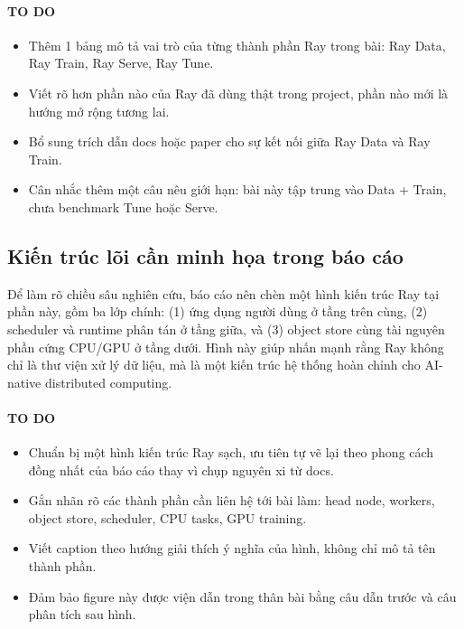 \paragraph{TO DO}
\begin{itemize}
    \item Thêm 1 bảng mô tả vai trò của từng thành phần Ray trong bài: Ray Data, Ray Train, Ray Serve, Ray Tune.
    \item Viết rõ hơn phần nào của Ray đã dùng thật trong project, phần nào mới là hướng mở rộng tương lai.
    \item Bổ sung trích dẫn docs hoặc paper cho sự kết nối giữa Ray Data và Ray Train.
    \item Cân nhắc thêm một câu nêu giới hạn: bài này tập trung vào Data + Train, chưa benchmark Tune hoặc Serve.
\end{itemize}

\subsection{Kiến trúc lõi cần minh họa trong báo cáo}
Để làm rõ chiều sâu nghiên cứu, báo cáo nên chèn một hình kiến trúc Ray tại phần này, gồm ba lớp chính: (1) ứng dụng người dùng ở tầng trên cùng, (2) scheduler và runtime phân tán ở tầng giữa, và (3) object store cùng tài nguyên phần cứng CPU/GPU ở tầng dưới. Hình này giúp nhấn mạnh rằng Ray không chỉ là thư viện xử lý dữ liệu, mà là một kiến trúc hệ thống hoàn chỉnh cho AI-native distributed computing.

\paragraph{TO DO}
\begin{itemize}
    \item Chuẩn bị một hình kiến trúc Ray sạch, ưu tiên tự vẽ lại theo phong cách đồng nhất của báo cáo thay vì chụp nguyên xi từ docs.
    \item Gắn nhãn rõ các thành phần cần liên hệ tới bài làm: head node, workers, object store, scheduler, CPU tasks, GPU training.
    \item Viết caption theo hướng giải thích ý nghĩa của hình, không chỉ mô tả tên thành phần.
    \item Đảm bảo figure này được viện dẫn trong thân bài bằng câu dẫn trước và câu phân tích sau hình.
\end{itemize}